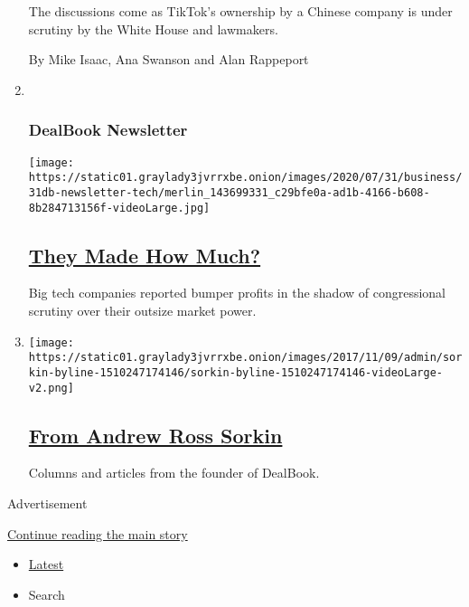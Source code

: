 \begin{enumerate}
  The discussions come as TikTok's ownership by a Chinese company is
  under scrutiny by the White House and lawmakers.

  By Mike Isaac, Ana Swanson and Alan Rappeport
\item ~
  \hypertarget{dealbook-newsletter-1}{%
  \subsubsection{DealBook Newsletter}\label{dealbook-newsletter-1}}

  \texttt{[image: https://static01.graylady3jvrrxbe.onion/images/2020/07/31/business/31db-newsletter-tech/merlin\_143699331\_c29bfe0a-ad1b-4166-b608-8b284713156f-videoLarge.jpg]}

  \hypertarget{they-made-how-much}{%
  \subsection{\texorpdfstring{\href{/2020/07/31/business/dealbook/tech-earnings-economy.html}{They
  Made How Much?}}{They Made How Much?}}\label{they-made-how-much}}

  Big tech companies reported bumper profits in the shadow of
  congressional scrutiny over their outsize market power.
\item
  \texttt{[image: https://static01.graylady3jvrrxbe.onion/images/2017/11/09/admin/sorkin-byline-1510247174146/sorkin-byline-1510247174146-videoLarge-v2.png]}

  \hypertarget{from-andrew-ross-sorkin}{%
  \subsection{\texorpdfstring{\href{/interactive/2017/business/dealbook/sorkin-byline.html}{From
  Andrew Ross
  Sorkin}}{From Andrew Ross Sorkin}}\label{from-andrew-ross-sorkin}}

  Columns and articles from the founder of DealBook.
\end{enumerate}

Advertisement

\protect\hyperlink{after-mid1}{Continue reading the main story}

\begin{itemize}
\tightlist
\item
  \protect\hyperlink{stream-panel}{Latest}
\item
  Search
\end{itemize}

